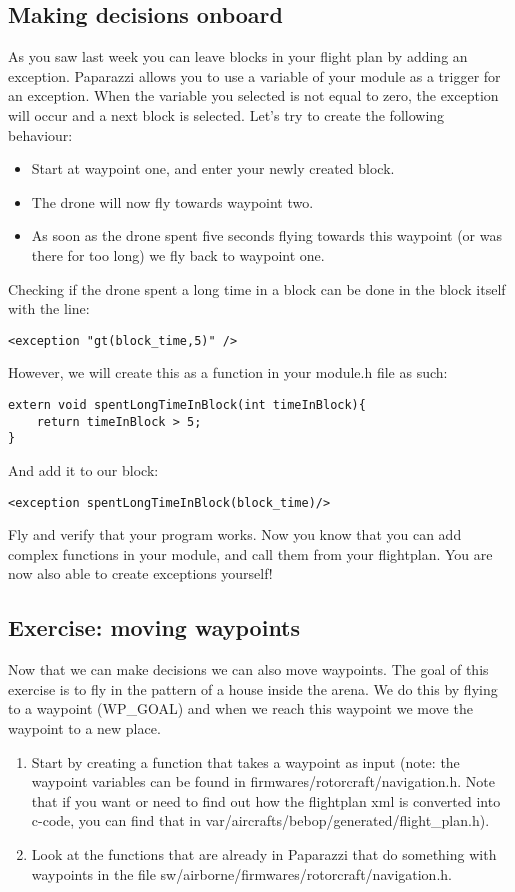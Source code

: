 \documentclass{article}
\begin{document}
\subsection*{Making decisions onboard}
As you saw last week you can leave blocks in your flight plan by adding an exception. Paparazzi allows you to use a variable of your module as a trigger for an exception. When the variable you selected is not equal to zero, the exception will occur and a next block is selected. 
Let's try to create the following behaviour: 
\begin{itemize}
\item Start at waypoint one, and enter your newly created block. 
\item The drone will now fly towards waypoint two. 
\item As soon as the drone spent five seconds flying towards this waypoint (or was there for too long) we fly back to waypoint one. 
\end{itemize}
Checking if the drone spent a long time in a block can be done in the block itself with the line:
\begin{verbatim}
<exception "gt(block_time,5)" /> 
\end{verbatim}
However, we will create this as a function in your module.h file as such:
\begin{verbatim}
extern void spentLongTimeInBlock(int timeInBlock){
	return timeInBlock > 5;
}
\end{verbatim}
And add it to our block:
\begin{verbatim}
<exception spentLongTimeInBlock(block_time)/>
\end{verbatim}
Fly and verify that your program works. Now you know that you can add complex functions in your module, and call them from your flightplan. 
You are now also able to create exceptions yourself!

\subsection*{Exercise: moving waypoints}
Now that we can make decisions we can also move waypoints. The goal of this exercise is to fly in the pattern of a house inside the arena. 
We do this by flying to a waypoint (WP\_GOAL) and when we reach this waypoint we move the waypoint to a new place. 

\begin{enumerate}
\item Start by creating a function that takes a waypoint as input (note: the waypoint variables can be found in firmwares/rotorcraft/navigation.h. Note that if you want or need to find out how the flightplan xml is converted into c-code, you can find that in var/aircrafts/bebop/generated/flight\_plan.h).
\item Look at the functions that are already in Paparazzi that do something with waypoints in the file sw/airborne/firmwares/rotorcraft/navigation.h. 
\end{enumerate}
\end{document}

